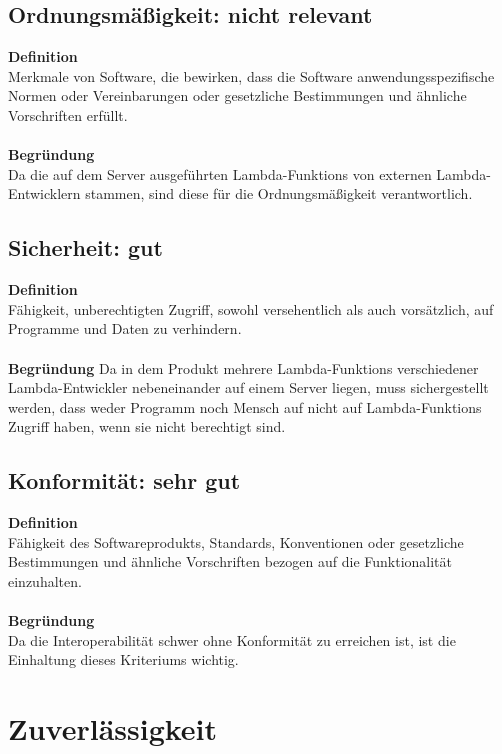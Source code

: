 \documentclass[a4paper,20pt,oneside]{book}
\begin{document}
\subsection{Ordnungsmäßigkeit: nicht relevant}

\textbf{Definition} \\
Merkmale von Software, die bewirken, dass die Software anwendungsspezifische Normen oder Vereinbarungen oder gesetzliche Bestimmungen und ähnliche Vorschriften erfüllt. \\ \\
\textbf{Begründung} \\
Da die auf dem Server ausgeführten \glspl{Lambda-Funktion} von externen \gls{Lambda-Entwickler}n stammen, sind diese für die Ordnungsmäßigkeit verantwortlich.

\subsection{Sicherheit: gut}

\textbf{Definition} \\
Fähigkeit, unberechtigten Zugriff, sowohl versehentlich als auch vorsätzlich, auf Programme und Daten zu verhindern.\\ \\
\textbf{Begründung}
Da in dem Produkt mehrere \glspl{Lambda-Funktion} verschiedener \gls{Lambda-Entwickler} nebeneinander auf einem Server liegen, muss sichergestellt werden, dass weder Programm noch Mensch auf nicht auf \glspl{Lambda-Funktion} Zugriff haben, wenn sie nicht berechtigt sind.

\subsection{Konformität: sehr gut}

\textbf{Definition} \\
Fähigkeit des Softwareprodukts, Standards, Konventionen oder gesetzliche Bestimmungen und ähnliche Vorschriften bezogen auf die Funktionalität einzuhalten. \\ \\
\textbf{Begründung}\\
Da die Interoperabilität schwer ohne Konformität zu erreichen ist, ist die Einhaltung dieses Kriteriums wichtig.
\\
\section{Zuverlässigkeit}
\end{document}
